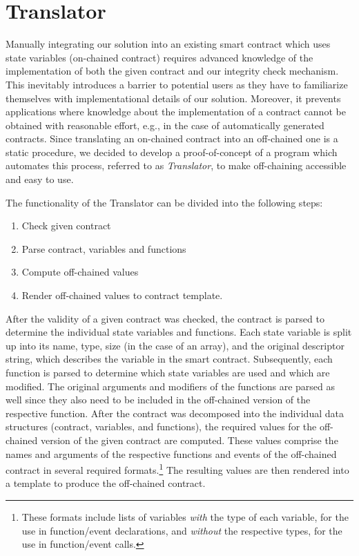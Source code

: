 	\section{Translator}
	\label{subsec:translator}

		Manually integrating our solution into an existing smart contract which uses state variables (on-chained contract) requires advanced knowledge of the implementation of both the given contract and our integrity check mechanism.
		This inevitably introduces a barrier to potential users as they have to familiarize themselves with implementational details of our solution.
		Moreover, it prevents applications where knowledge about the implementation of a contract cannot be obtained with reasonable effort, e.g., in the case of automatically generated contracts.
		Since translating an on-chained contract into an off-chained one is a static procedure, we decided to develop a proof-of-concept of a program which automates this process, referred to as \emph{Translator}, to make off-chaining accessible and easy to use.

		The functionality of the Translator can be divided into the following steps:
		\begin{enumerate}
		\setlength{\itemsep}{0pt}
		\setlength{\parskip}{0pt}
			\item Check given contract
			\item Parse contract, variables and functions
			\item Compute off-chained values
			\item Render off-chained values to contract template.
		\end{enumerate}
		After the validity of a given contract was checked, the contract is parsed to determine the individual state variables and functions.
		Each state variable is split up into its name, type, size (in the case of an array), and the original descriptor string, which describes the variable in the smart contract.
		Subsequently, each function is parsed to determine which state variables are used and which are modified.
		The original arguments and modifiers of the functions are parsed as well since they also need to be included in the off-chained version of the respective function.
		After the contract was decomposed into the individual data structures (contract, variables, and functions), the required values for the off-chained version of the given contract are computed.
		These values comprise the names and arguments of the respective functions and events of the off-chained contract in several required formats.\footnote{These formats include lists of variables \emph{with} the type of each variable, for the use in function/event declarations, and \emph{without} the respective types, for the use in function/event calls.}
		The resulting values are then rendered into a template to produce the off-chained contract.

